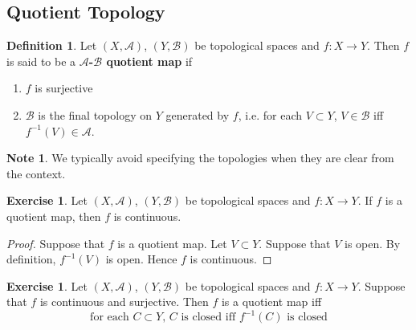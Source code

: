 \documentclass[12pt]{amsart}
\theoremstyle{definition}
\newtheorem{defn}[definition]{Definition}
\newtheorem{note}[definition]{Note}
\newtheorem{ex}[definition]{Exercise}
\newcommand{\MA}{\mathcal{A}}
\newcommand{\MB}{\mathcal{B}}
\newcommand{\lex}[1]{\label{ex:#1}}
\newcommand{\ld}[1]{\label{defn:#1}}
\begin{document}
	
	
	
	
	
	
	
	
	
	
	
	
	
	\newpage
	\subsection{Quotient Topology}
	
	\begin{defn} \ld{34001}
	Let $(X, \MA)$, $(Y, \MB)$ be topological spaces and $f:X \rightarrow Y$. Then $f$ is said to be a \textbf{$\MA$-$\MB$ quotient map} if 
	\begin{enumerate}
	\item $f$ is surjective
	\item $\MB$ is the final topology on $Y$ generated by $f$, i.e. for each $V \subset Y$, $V \in \MB$ iff $f^{-1}(V) \in \MA$.
	\end{enumerate}
	\end{defn}
	
	\begin{note}
	We typically avoid specifying the topologies when they are clear from the context.
	\end{note}
	
	\begin{ex} \lex{34002}
	Let $(X, \MA)$, $(Y, \MB)$ be topological spaces and $f:X \rightarrow Y$. If $f$ is a quotient map, then $f$ is continuous.
	\end{ex}
	
	\begin{proof}
	Suppose that $f$ is a quotient map. Let $V \subset Y$. Suppose that $V$ is open. By definition, $f^{-1}(V)$ is open. Hence $f$ is continuous.  
	\end{proof}
	
	\begin{ex} \lex{34003}
	Let $(X, \MA)$, $(Y, \MB)$ be topological spaces and $f:X \rightarrow Y$. Suppose that $f$ is continuous and surjective. Then $f$ is a quotient map iff 
	\begin{equation*}
	\text{for each $C \subset Y$, $C$ is closed iff $f^{-1}(C)$ is closed} 
	\end{equation*}	
	\end{ex}
	
\end{document}

